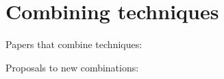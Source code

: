 \section{Combining techniques}
\label{sec:comb}

Papers that combine techniques:


Proposals to new combinations: